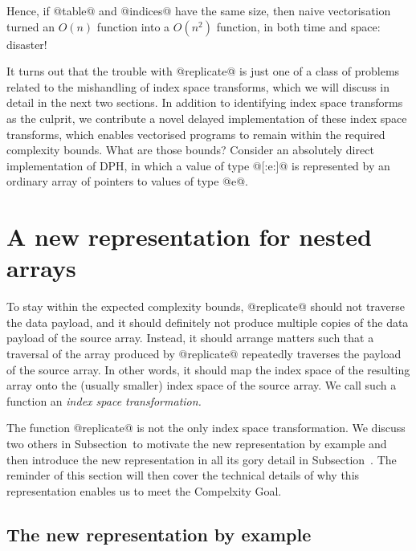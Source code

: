 Hence, if @table@ and @indices@ have the same size, then naive vectorisation turned an $O(n)$ function into a $O(n^2)$ function, in both time and space: disaster! 

It turns out that the trouble with @replicate@ is just one of a class of problems related to the mishandling of index space transforms, which we will discuss in detail in the next two sections. In addition to identifying index space transforms as the culprit, we contribute a novel delayed implementation of these index space transforms, which enables vectorised programs to remain within the required complexity bounds.   What are those bounds?  Consider an absolutely direct implementation of DPH, in which a value of type @[:e:]@ is represented by an ordinary array of pointers to values of type @e@.


\clearpage{}
\section{A new representation for nested arrays}

To stay within the expected complexity bounds, @replicate@ should not traverse the data payload, and it should definitely not produce multiple copies of the data payload of the source array. Instead, it should arrange matters such that a traversal of the array produced by @replicate@ repeatedly traverses the payload of the source array.  In other words, it should map the index space of the resulting array onto the (usually smaller) index space of the source array.  We call such a function an \emph{index space transformation.}

The function @replicate@ is not the only index space transformation.  We discuss two others in Subsection~\REF to motivate the new representation by example and then introduce the new representation in all its gory detail in Subsection~\REF.  The reminder of this section will then cover the technical details of why this representation enables us to meet the Compelxity Goal.


\subsection{The new representation by example}
\label{sec:new-rep-ex}

